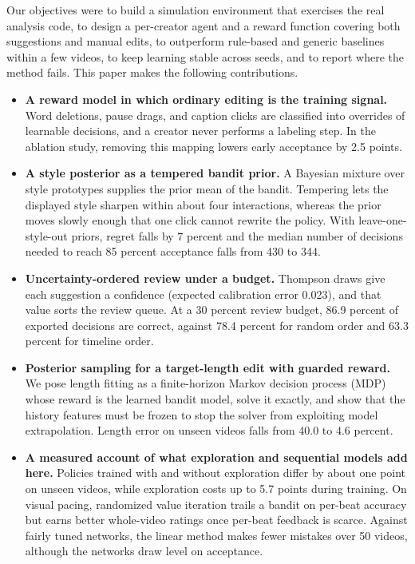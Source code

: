 \documentclass{ieeeaccess}
\begin{document}
Our objectives were to build a simulation environment that exercises the real analysis code, to design a per-creator agent and a reward function covering both suggestions and manual edits, to outperform rule-based and generic baselines within a few videos, to keep learning stable across seeds, and to report where the method fails. This paper makes the following contributions.

\begin{itemize}
\item \textbf{A reward model in which ordinary editing is the training signal.} Word deletions, pause drags, and caption clicks are classified into overrides of learnable decisions, and a creator never performs a labeling step. In the ablation study, removing this mapping lowers early acceptance by 2.5 points.
\item \textbf{A style posterior as a tempered bandit prior.} A Bayesian mixture over style prototypes supplies the prior mean of the bandit. Tempering lets the displayed style sharpen within about four interactions, whereas the prior moves slowly enough that one click cannot rewrite the policy. With leave-one-style-out priors, regret falls by 7 percent and the median number of decisions needed to reach 85 percent acceptance falls from 430 to 344.
\item \textbf{Uncertainty-ordered review under a budget.} Thompson draws give each suggestion a confidence (expected calibration error 0.023), and that value sorts the review queue. At a 30 percent review budget, 86.9 percent of exported decisions are correct, against 78.4 percent for random order and 63.3 percent for timeline order.
\item \textbf{Posterior sampling for a target-length edit with guarded reward.} We pose length fitting as a finite-horizon Markov decision process (MDP) whose reward is the learned bandit model, solve it exactly, and show that the history features must be frozen to stop the solver from exploiting model extrapolation. Length error on unseen videos falls from 40.0 to 4.6 percent.
\item \textbf{A measured account of what exploration and sequential models add here.} Policies trained with and without exploration differ by about one point on unseen videos, while exploration costs up to 5.7 points during training. On visual pacing, randomized value iteration trails a bandit on per-beat accuracy but earns better whole-video ratings once per-beat feedback is scarce. Against fairly tuned networks, the linear method makes fewer mistakes over 50 videos, although the networks draw level on acceptance.
\end{itemize}
\end{document}

